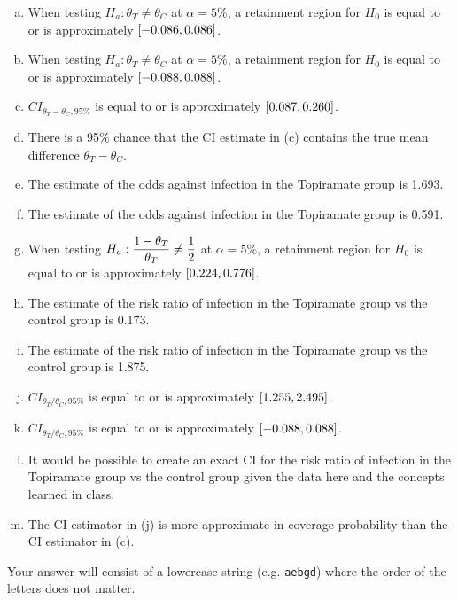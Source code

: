 \documentclass[12pt,landscape]{article}
\newcommand{\instr}{\small Your answer will consist of a lowercase string (e.g. \texttt{aebgd}) where the order of the letters does not matter. \normalsize}
\begin{document}
\begin{enumerate}[(a)]
\item When testing $H_a: \theta_T \neq \theta_C$ at $\alpha = 5\%$, a retainment region for $H_0$ is equal to or is approximately $\left[-0.086, 0.086\right]$.%
\item When testing $H_a: \theta_T \neq \theta_C$ at $\alpha = 5\%$, a retainment region for $H_0$ is equal to or is approximately $\left[-0.088, 0.088\right]$.%
\item $CI_{\theta_T - \theta_C, 95\%}$ is equal to or is approximately $\left[0.087, 0.260\right]$.%
\item There is a 95\% chance that the CI estimate in (c) contains the true mean difference $\theta_T - \theta_C$.
\item The estimate of the odds against infection in the Topiramate group is 1.693. %
\item The estimate of the odds against infection in the Topiramate group is 0.591. %
\item When testing $H_a: \displaystyle \frac{1 - \theta_T}{\theta_T} \neq \frac{1}{2}$ at $\alpha = 5\%$, a retainment region for $H_0$ is equal to or is approximately $\left[0.224, 0.776\right]$.%
\item The estimate of the risk ratio of infection in the Topiramate group vs the control group is 0.173.%
\item The estimate of the risk ratio of infection in the Topiramate group vs the control group is 1.875.%
\item $CI_{\theta_T / \theta_C, 95\%}$ is equal to or is approximately $\left[1.255, 2.495\right]$.%
\item $CI_{\theta_T / \theta_C, 95\%}$ is equal to or is approximately $\left[-0.088, 0.088\right]$.%
\item It would be possible to create an exact CI for the risk ratio of infection in the Topiramate group vs the control group given the data here and the concepts learned in class.%
\item The CI estimator in (j) is more approximate in coverage probability than the CI estimator in (c).
\end{enumerate}
\eenum\instr\pagebreak

\end{document}
